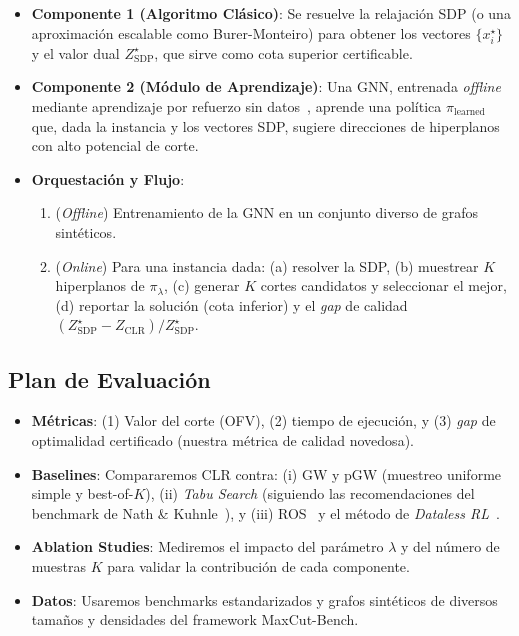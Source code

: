 \documentclass{article}
\begin{document}
\begin{itemize}
    \item \textbf{Componente 1 (Algoritmo Clásico)}: Se resuelve la relajación SDP (o una aproximación escalable como Burer-Monteiro) para obtener los vectores $\{x_i^\star\}$ y el valor dual $Z_{\text{SDP}}^\star$, que sirve como cota superior certificable.
    
    \item \textbf{Componente 2 (Módulo de Aprendizaje)}: Una GNN, entrenada \textit{offline} mediante aprendizaje por refuerzo sin datos~\cite{maliakal2025datalessreinforcementlearningapproach}, aprende una política $\pi_{\text{learned}}$ que, dada la instancia y los vectores SDP, sugiere direcciones de hiperplanos con alto potencial de corte.
    
    \item \textbf{Orquestación y Flujo}:
    \begin{enumerate}
        \item (\textit{Offline}) Entrenamiento de la GNN en un conjunto diverso de grafos sintéticos.
        \item (\textit{Online}) Para una instancia dada: (a) resolver la SDP, (b) muestrear $K$ hiperplanos de $\pi_\lambda$, (c) generar $K$ cortes candidatos y seleccionar el mejor, (d) reportar la solución (cota inferior) y el \textit{gap} de calidad $(Z_{\text{SDP}}^\star - Z_{\text{CLR}}) / Z_{\text{SDP}}^\star$.
    \end{enumerate}
\end{itemize}

\subsection{Plan de Evaluación}

\begin{itemize}
    \item \textbf{Métricas}: (1) Valor del corte (OFV), (2) tiempo de ejecución, y (3) \textit{gap} de optimalidad certificado (nuestra métrica de calidad novedosa).
    \item \textbf{Baselines}: Compararemos CLR contra: (i) GW y pGW (muestreo uniforme simple y best-of-$K$), (ii) \textit{Tabu Search} (siguiendo las recomendaciones del benchmark de Nath \& Kuhnle~\cite{nath2024benchmarkmaximumcutstandardization}), y (iii) ROS~\cite{qiu2025rosgnnbasedrelaxoptimizeandsampleframework} y el método de \textit{Dataless RL}~\cite{maliakal2025datalessreinforcementlearningapproach}.
    \item \textbf{Ablation Studies}: Mediremos el impacto del parámetro $\lambda$ y del número de muestras $K$ para validar la contribución de cada componente.
    \item \textbf{Datos}: Usaremos benchmarks estandarizados y grafos sintéticos de diversos tamaños y densidades del framework MaxCut-Bench.
\end{itemize}
\end{document}
